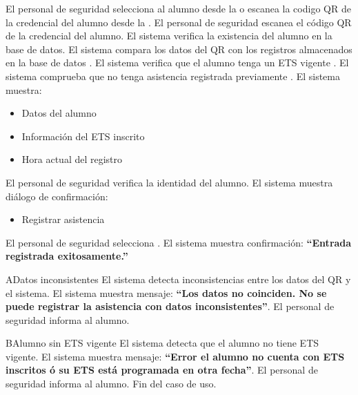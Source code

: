 \begin{UCtrayectoria}
	\UCpaso[\UCactor] El personal de seguridad selecciona al alumno desde la  o escanea la codigo QR de la credencial del alumno desde la .
	\UCpaso[\UCactor] El personal de seguridad escanea el código QR de la credencial del alumno.
	\UCpaso El sistema verifica la existencia del alumno en la base de datos.
	\UCpaso El sistema compara los datos del QR con los registros almacenados en la base de datos .
	\UCpaso El sistema verifica que el alumno tenga un ETS vigente .
	\UCpaso El sistema comprueba que no tenga asistencia registrada previamente .
	\UCpaso El sistema muestra:
	\begin{itemize}
		\item Datos del alumno 
		\item Información del ETS inscrito
		\item Hora actual del registro
	\end{itemize}
	\UCpaso[\UCactor] El personal de seguridad verifica la identidad del alumno.
	\UCpaso El sistema muestra diálogo de confirmación:
	\begin{itemize}
		\item Registrar asistencia 
	\end{itemize}
	\UCpaso[\UCactor] El personal de seguridad selecciona .
	\UCpaso El sistema muestra confirmación: {\bf ``Entrada registrada exitosamente.''}
\end{UCtrayectoria}
\begin{UCtrayectoriaA}{A}{Datos inconsistentes}
	\UCpaso El sistema detecta inconsistencias entre los datos del QR y el sistema.
	\UCpaso El sistema muestra mensaje: {\bf ``Los datos no coinciden. No se puede registrar la asistencia con datos inconsistentes''}.
	\UCpaso[\UCactor] El personal de seguridad informa al alumno.
\end{UCtrayectoriaA}
\begin{UCtrayectoriaA}{B}{Alumno sin ETS vigente}
	\UCpaso El sistema detecta que el alumno no tiene ETS vigente.
	\UCpaso El sistema muestra mensaje: {\bf ``Error el alumno no cuenta con ETS inscritos ó su ETS está programada en otra fecha''}.
	\UCpaso[\UCactor] El personal de seguridad informa al alumno.
	\UCpaso Fin del caso de uso.
\end{UCtrayectoriaA}
